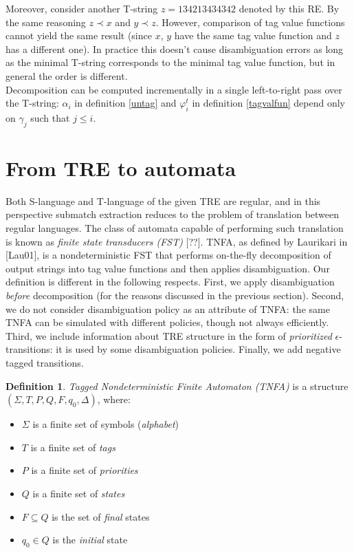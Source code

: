 \documentclass{article}
\newcommand{\Xeq}{\!=\!}
\theoremstyle{definition}
\newtheorem{Xdef}{Definition}
\begin{document}
\begin{multicols}{2}
Moreover, consider another T-string $z \Xeq 1 3 4 2 1 3 4 3 4 3 4 2$ denoted by this RE.
By the same reasoning $z \prec x$ and $y \prec z$.
However, comparison of tag value functions cannot yield the same result
(since $x$, $y$ have the same tag value function and $z$ has a different one).
In practice this doesn't cause disambiguation errors
as long as the minimal T-string corresponds to the minimal tag value function,
but in general the order is different.
\\

Decomposition can be computed incrementally in a single left-to-right pass over the T-string:
$\alpha_i$ in definition \ref{untag} and
$\varphi_i^t$ in definition \ref{tagvalfun} depend only on $\gamma_j$ such that $j \!\leq\! i$.

\section{From TRE to automata}\label{section_tnfa}

Both S-language and T-language of the given TRE are regular,
and in this perspective submatch extraction reduces to the problem of translation between regular languages.
The class of automata capable of performing such translation is known as \emph{finite state transducers (FST)} [??].
TNFA, as defined by Laurikari in [Lau01], is a nondeterministic FST
that performs on-the-fly decomposition of output strings into tag value functions
and then applies disambiguation.
Our definition is different in the following respects.
First, we apply disambiguation \emph{before} decomposition
(for the reasons discussed in the previous section).
Second, we do not consider disambiguation policy as an attribute of TNFA:
the same TNFA can be simulated with different policies, though not always efficiently.
Third, we include information about TRE structure in the form of \emph{prioritized} $\epsilon$-transitions:
it is used by some disambiguation policies.
Finally, we add negative tagged transitions.

    \begin{Xdef}
    \emph{Tagged Nondeterministic Finite Automaton (TNFA)}
    is a structure $(\Sigma, T, P, Q, F, q_0, \Delta)$, where:
    \begin{itemize}
    \setlength{\parskip}{0.5em}
        \item[] $\Sigma$ is a finite set of symbols (\emph{alphabet})
        \item[] $T$ is a finite set of \emph{tags}
        \item[] $P$ is a finite set of \emph{priorities}
        \item[] $Q$ is a finite set of \emph{states}
        \item[] $F \subseteq Q$ is the set of \emph{final} states
        \item[] $q_0 \in Q$ is the \emph{initial} state


\end{itemize}
\end{Xdef}
\end{multicols}
\end{document}
